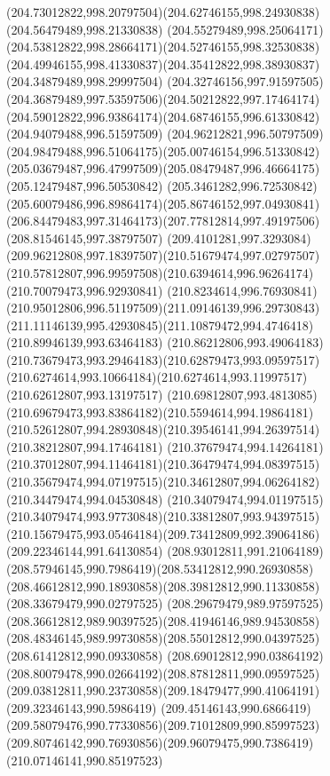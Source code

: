 {{		\curveto(204.73012822,998.20797504)(204.62746155,998.24930838)(204.56479489,998.21330838)
		\curveto(204.55279489,998.25064171)(204.53812822,998.28664171)(204.52746155,998.32530838)
		\curveto(204.49946155,998.41330837)(204.35412822,998.38930837)(204.34879489,998.29997504)
		\curveto(204.32746156,997.91597505)(204.36879489,997.53597506)(204.50212822,997.17464174)
		\curveto(204.59012822,996.93864174)(204.68746155,996.61330842)(204.94079488,996.51597509)
		\curveto(204.96212821,996.50797509)(204.98479488,996.51064175)(205.00746154,996.51330842)
		\curveto(205.03679487,996.47997509)(205.08479487,996.46664175)(205.12479487,996.50530842)
		\curveto(205.3461282,996.72530842)(205.60079486,996.89864174)(205.86746152,997.04930841)
		\curveto(206.84479483,997.31464173)(207.77812814,997.49197506)(208.81546145,997.38797507)
		\curveto(209.4101281,997.3293084)(209.96212808,997.18397507)(210.51679474,997.02797507)
		\curveto(210.57812807,996.99597508)(210.6394614,996.96264174)(210.70079473,996.92930841)
		\curveto(210.8234614,996.76930841)(210.95012806,996.51197509)(211.09146139,996.29730843)
		\curveto(211.11146139,995.42930845)(211.10879472,994.4746418)(210.89946139,993.63464183)
		\curveto(210.86212806,993.49064183)(210.73679473,993.29464183)(210.62879473,993.09597517)
		\curveto(210.6274614,993.10664184)(210.6274614,993.11997517)(210.62612807,993.13197517)
		\curveto(210.69812807,993.4813085)(210.69679473,993.83864182)(210.5594614,994.19864181)
		\curveto(210.52612807,994.28930848)(210.39546141,994.26397514)(210.38212807,994.17464181)
		\curveto(210.37679474,994.14264181)(210.37012807,994.11464181)(210.36479474,994.08397515)
		\curveto(210.35679474,994.07197515)(210.34612807,994.06264182)(210.34479474,994.04530848)
		\curveto(210.34079474,994.01197515)(210.34079474,993.97730848)(210.33812807,993.94397515)
		\curveto(210.15679475,993.05464184)(209.73412809,992.39064186)(209.22346144,991.64130854)
		\curveto(208.93012811,991.21064189)(208.57946145,990.7986419)(208.53412812,990.26930858)
		\curveto(208.46612812,990.18930858)(208.39812812,990.11330858)(208.33679479,990.02797525)
		\curveto(208.29679479,989.97597525)(208.36612812,989.90397525)(208.41946146,989.94530858)
		\curveto(208.48346145,989.99730858)(208.55012812,990.04397525)(208.61412812,990.09330858)
		\curveto(208.69012812,990.03864192)(208.80079478,990.02664192)(208.87812811,990.09597525)
		\curveto(209.03812811,990.23730858)(209.18479477,990.41064191)(209.32346143,990.5986419)
		\curveto(209.45146143,990.6866419)(209.58079476,990.77330856)(209.71012809,990.85997523)
		\curveto(209.80746142,990.76930856)(209.96079475,990.7386419)(210.07146141,990.85197523)
}}
